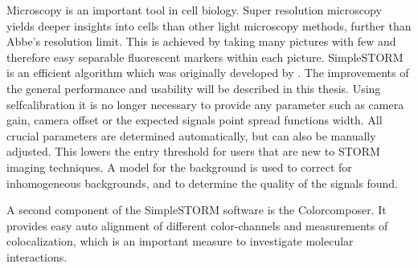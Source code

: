 Microscopy is an important tool in cell biology. Super resolution microscopy yields deeper insights into cells than other light microscopy methods, further than Abbe's resolution limit. This is achieved by taking many pictures with few and therefore easy separable fluorescent markers within each picture.\newline
SimpleSTORM is an efficient algorithm which was originally developed by \cite{MAJoachim}. The improvements of the general performance and usability will be described in this thesis.\newline
Using selfcalibration it is no longer necessary to provide any parameter such as camera gain, camera offset or the expected signals point spread functions width. All crucial parameters are determined automatically, but can also be manually adjusted. This lowers the entry threshold for users that are new to STORM imaging techniques.
A model for the background is used to correct for inhomogeneous backgrounds, and to determine the quality of the signals found.\newline

A second component of the SimpleSTORM software is the Colorcomposer. It provides easy auto alignment of different color-channels and measurements of colocalization, which is an important measure to investigate molecular interactions.

